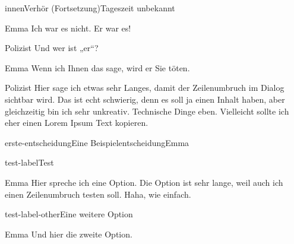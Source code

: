 \documentclass[12pt]{article}
\begin{document}
    \begin{scene}{innen}{Verhör (Fortsetzung)}{Tageszeit unbekannt}
        \begin{dialog}{Emma}
            Ich war es nicht.
            Er war es!
        \end{dialog}

        \begin{dialog}{Polizist}
            Und wer ist „er“?
        \end{dialog}


        \begin{dialog}{Emma}
            Wenn ich Ihnen das sage, wird er Sie töten.
        \end{dialog}

        \begin{dialog}{Polizist}
            Hier sage ich etwas sehr Langes, damit der Zeilenumbruch im Dialog sichtbar wird.
            Das ist echt schwierig, denn es soll ja einen Inhalt haben, aber gleichzeitig bin ich sehr unkreativ.
            Technische Dinge eben.
            Vielleicht sollte ich eher einen Lorem Ipsum Text kopieren.
        \end{dialog}

        \begin{decision}{erste-entscheidung}{Eine Beispielentscheidung}{Emma}
            \begin{option}{test-label}{Test}
                \begin{dialog}{Emma}
                    Hier spreche ich eine Option.
                    Die Option ist sehr lange, weil auch ich einen Zeilenumbruch testen soll.
                    Haha, wie einfach.
                \end{dialog}
            \end{option}
            \begin{option}{test-label-other}{Eine weitere Option}
                \begin{dialog}{Emma}
                    Und hier die zweite Option.
                \end{dialog}
            \end{option}
        \end{decision}


\end{scene}
\end{document}
